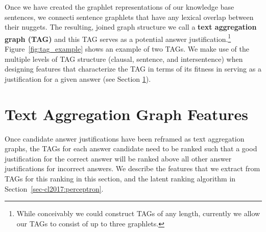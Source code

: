 Once we have created the graphlet representations of our knowledge base sentences, we connecti sentence graphlets that have any lexical overlap between their nuggets.  The resulting, joined graph structure we call a \textbf{text aggregation graph (TAG)} and this TAG serves as a potential answer justification.\footnote{While conceivably we could construct TAGs of any length, currently we allow our TAGs to consist of up to three graphlets.}
Figure~\ref{fig:tag_example} shows an example of two TAGs. 
We make use of the multiple levels of TAG structure (clausal, sentence, and intersentence) when designing features that characterize the TAG in terms of its fitness in serving as a justification for a given answer (see Section \ref{sec-cl2017:scoring}).




\section{Text Aggregation Graph Features}
\label{sec-cl2017:scoring}

Once candidate answer justifications have been reframed as text aggregation graphs, the TAGs for each answer candidate need to be ranked such that a good justification for the correct answer will be ranked above all other answer justifications for incorrect answers. We describe the features that we extract from TAGs for this ranking in this section, and the latent ranking algorithm in Section~\ref{sec-cl2017:perceptron}.





